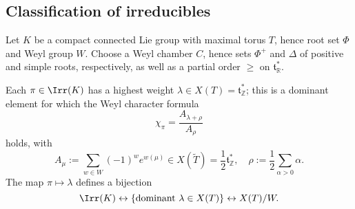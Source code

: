 \documentclass[reqno]{amsart} 
\begin{document}
\subsection{Classification of irreducibles}
\begin{theorem}\label{thm:highest-weight-general-gp}
  Let $K$ be a compact connected Lie group with maximal torus $T$, hence root set $\Phi$ and Weyl group $W$.  Choose a Weyl chamber $C$, hence sets $\Phi^+$ and $\Delta$ of positive and simple roots, respectively, as well as a partial order $\geq$ on $\mathfrak{t}_{\mathbb{R}}^*$.

  Each $\pi \in \Irr(K)$ has a highest weight $\lambda \in X(T) = \mathfrak{t}_{\mathbb{Z}}^*$; this is a dominant element for which the Weyl character formula
  \begin{equation*}
    \chi_{\pi} = \frac{A_{\lambda+\rho}}{A_\rho }
  \end{equation*}
  holds, with
  \begin{equation*}
    A_{\mu} := \sum_{w \in W} (-1)^w e^{w(\mu)} \in X(\tilde{T}) = \frac{1}{2} \mathfrak{t}_{\mathbb{Z}}^*, \quad \rho := \frac{1}{2} \sum_{\alpha > 0} \alpha.
  \end{equation*}
  The map $\pi \mapsto \lambda$ defines a bijection
  \begin{equation}\label{eq:}
    \Irr(K)
    \leftrightarrow \{\text{dominant }
    \lambda \in X(T)\}
    \leftrightarrow
    X(T)/W.
  \end{equation}
\end{theorem}
\end{document}
